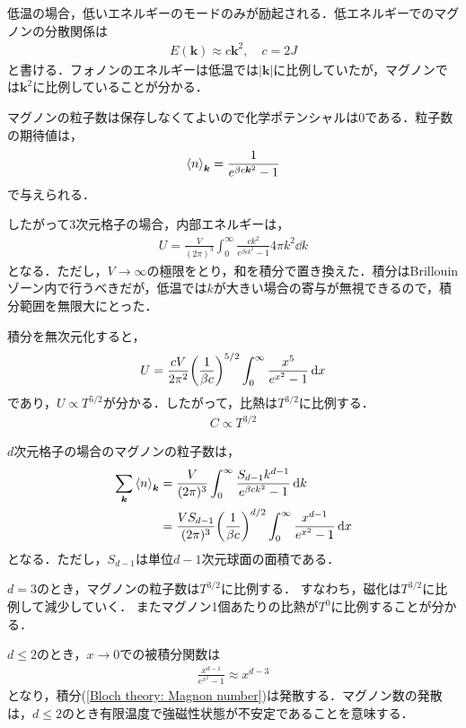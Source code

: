 \documentclass[../main.tex]{subfiles}
\begin{document}
\begin{frame}
    低温の場合，低いエネルギーのモードのみが励起される．低エネルギーでのマグノンの分散関係は
    \begin{align}
        E(\bm{k}) \approx c\bm{k}^2, \quad c = 2J
    \end{align}
    と書ける．フォノンのエネルギーは低温では$|\bm{k}|$に比例していたが，マグノンでは$\bm{k}^2$に比例していることが分かる．

    マグノンの粒子数は保存しなくてよいので化学ポテンシャルは$0$である．粒子数の期待値は，
    \begin{align}
        \expval{n}_{\bm{k}} = \frac{1}{e^{\beta c \bm{k}^2}-1}
    \end{align}
    で与えられる．
\end{frame}

\begin{frame}{}
    したがって3次元格子の場合，内部エネルギーは，
    \begin{align}
        U = \frac{V}{(2\pi)^3}\int_0^\infty \frac{ck^2}{e^{\beta c k^2}-1} 4\pi k^2 \dd{k}
    \end{align}
    となる．ただし，$V \to \infty$の極限をとり，和を積分で置き換えた．積分はBrillouinゾーン内で行うべきだが，低温では$k$が大きい場合の寄与が無視できるので，積分範囲を無限大にとった．

    積分を無次元化すると，
    \begin{align}
        U = \frac{cV}{2\pi^2} \qty(\frac{1}{\beta c})^{5/2} \int_0^\infty \frac{x^5}{e^{x^2} - 1} \dd{x}
    \end{align}
    であり，$U \propto T^{5/2}$が分かる．したがって，比熱は$T^{3/2}$に比例する．
    \begin{align}
        C \propto T^{3/2}
    \end{align}
\end{frame}

\begin{frame}
    $d$次元格子の場合のマグノンの粒子数は，
    \begin{align}
        \sum_{\bm{k}} \expval{n}_{\bm{k}}
        &\nonumber
        = \frac{V}{(2\pi)^3} \int_0^\infty \frac{S_{d-1}k^{d-1}}{e^{\beta c k^2}-1} \dd{k}
        \\ &
        = \frac{VS_{d-1}}{(2\pi)^3} \qty(\frac{1}{\beta c})^{d/2}\int_0^\infty \frac{x^{d-1}}{e^{x^2}-1}\dd{x}
        \label{Bloch theory: Magnon number}
    \end{align}
    となる．ただし，$S_{d-1}$は単位$d-1$次元球面の面積である．
    
    $d=3$のとき，マグノンの粒子数は$T^{3/2}$に比例する．
    すなわち，磁化は$T^{3/2}$に比例して減少していく．
    またマグノン1個あたりの比熱が$T^0$に比例することが分かる．

    $d \le 2$のとき，$x \to 0$での被積分関数は
    \begin{align}
        \frac{x^{d-1}}{e^{x^2}-1} \approx x^{d-3}
    \end{align}
    となり，積分(\ref{Bloch theory: Magnon number})は発散する．マグノン数の発散は，$d \le 2$のとき有限温度で\alert{強磁性状態が不安定}であることを意味する．
\end{frame}
\end{document}
